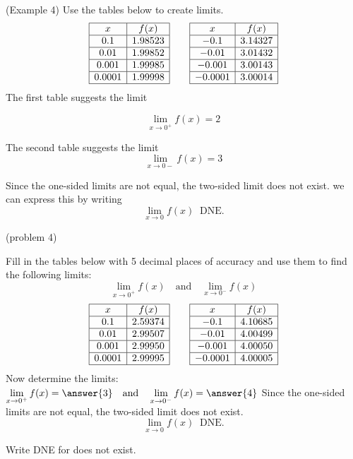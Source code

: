 \documentclass[handout]{ximera}
\begin{document}
\begin{example}(Example 4)
Use the tables below to create limits.
\[
\begin{array}{|c|c|} 
	\hline
	x & f(x)\\
	\hline
	0.1 & 1.98523 \\
	\hline
	0.01 & 1.99852 \\
	\hline
	0.001 & 1.99985 \\
    \hline
	0.0001 & 1.99998\\
	\hline
\end{array}
\qquad
\begin{array}{|c|c|} 
	\hline
	x & f(x) \\ 
	\hline
	-0.1 & 3.14327 \\
	\hline
	-0.01 & 3.01432 \\
	\hline
	-0.001 & 3.00143 \\
	\hline
	-0.0001 & 3.00014 \\
	\hline
\end{array}
\]
The first table suggests the limit


\[
\lim_{x \to 0^+} f(x) = 2
\]

The second table suggests the limit
\[
\lim_{x \to 0-} f(x) = 3
\]

Since the one-sided limits are not equal, the two-sided limit does not exist.
we can express this by writing
\[\lim_{x \to 0} f(x) \;\; \text{DNE}.\]
\end{example}
\begin{problem}(problem 4)

Fill in the tables below with 5 decimal places of accuracy and use them to find the following limits:
\[
\lim_{x \to 0^+} f(x) \quad \text{and} \quad \lim_{x \to 0^-} f(x)
\]
\[
\begin{array}{ |c | c |}
	\hline
	x & f(x) \\ 
	\hline
	0.1 & 2.59374 \\
	\hline
	0.01 & 2.99507 \\
	\hline
	0.001 & 2.99950 \\
	\hline
	0.0001 & 2.99995\\
	\hline
\end{array}
\qquad
\begin{array}{| c | c |}
	\hline
	x & f(x) \\ 
	\hline
	-0.1 & 4.10685 \\
	\hline
	-0.01 & 4.00499 \\
	\hline
	-0.001 & 4.00050 \\
	\hline
	-0.0001 & 4.00005\\
	\hline
\end{array}
\]
Now determine the limits:\\
$\displaystyle \lim_{x \to 0^+} f(x) = \answer{3} \quad \text{and} \quad \lim_{x \to 0^-} f(x) = \answer{4}$
Since the one-sided limits are not equal, the two-sided limit does not exist.
\[\lim_{x \to 0} f(x) \;\; \text{DNE}.\]
\begin{hint}
Write DNE for does not exist.
\end{hint}
\end{problem}
\end{document}
